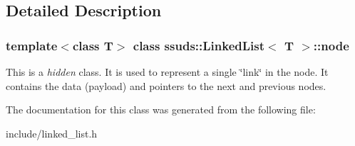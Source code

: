 \subsection{Detailed Description}
\subsubsection*{template$<$class T$>$\newline
class ssuds\+::\+Linked\+List$<$ T $>$\+::node}

This is a {\itshape hidden} class. It is used to represent a single \char`\"{}link\char`\"{} in the node. It contains the data (payload) and pointers to the next and previous nodes. 

The documentation for this class was generated from the following file\+:\begin{DoxyCompactItemize}
\item 
include/linked\+\_\+list.\+h\end{DoxyCompactItemize}
